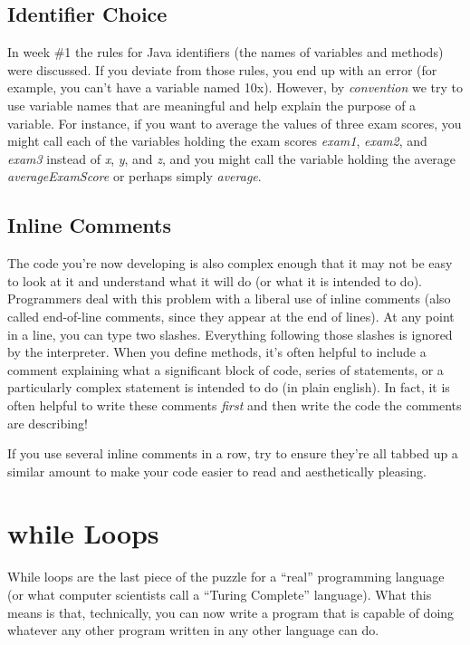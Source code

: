 \subsection{Identifier Choice} 

In week \#1 the rules for Java identifiers (the names of variables and methods) were discussed. If you deviate from those rules, you end up with an error (for example, you can't have a variable named 10x). However, by \textit{convention} we try to use variable names that are meaningful and help explain the purpose of a variable. For instance, if you want to average the values of three exam scores, you might call each of the variables holding the exam scores \textit{exam1}, \textit{exam2}, and \textit{exam3} instead of \textit{x}, \textit{y}, and \textit{z}, and you might call the variable holding the average \textit{averageExamScore} or perhaps simply \textit{average}.


\subsection{Inline Comments} 
The code you're now developing is also complex enough that it may not be easy to look at it and understand what it will do (or what it is intended to do). Programmers deal with this problem with a liberal use of inline comments (also called end-of-line comments, since they appear at the end of lines). At any point in a line, you can type two slashes. Everything following those slashes is ignored by the interpreter. When you define methods, it's often helpful to include a comment explaining what a significant block of code, series of statements, or a particularly complex statement is intended to do (in plain english). In fact, it is often helpful to write these comments \textit{first} and then write the code the comments are describing!

If you use several inline comments in a row, try to ensure they're all tabbed up a similar amount to make your code easier to read and aesthetically pleasing. 


\section{while Loops}

While loops are the last piece of the puzzle for a ``real'' programming language (or what computer scientists call a ``Turing Complete'' language). What this means is that, technically, you can now write a program that is capable of doing whatever any other program written in any other language can do. 

